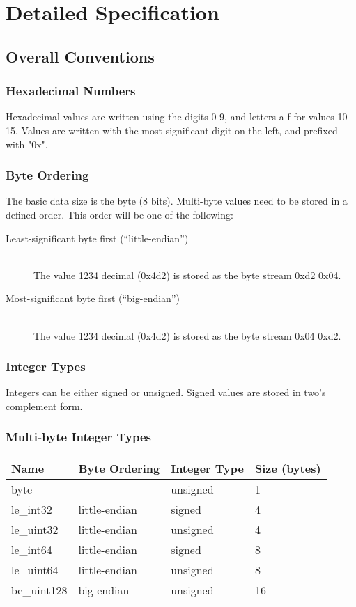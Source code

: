 \documentclass[10pt]{article}
\begin{document}
\section{Detailed Specification}
\subsection{Overall Conventions}
\subsubsection{Hexadecimal Numbers}
Hexadecimal values are written using the digits 0-9, and letters a-f for values 10-15.
Values are written with the most-significant digit on the left, and prefixed with "0x".

\subsubsection{Byte Ordering}
The basic data size is the byte (8 bits).
Multi-byte values need to be stored in a defined order.
This order will be one of the following:
\begin{description}
\item[Least-significant byte first (``little-endian'')]~\\
The value 1234 decimal (0x4d2) is stored as the byte stream 0xd2 0x04.

\item[Most-significant byte first (``big-endian'')]~\\
The value 1234 decimal (0x4d2) is stored as the byte stream 0x04 0xd2.
\end{description}

\subsubsection{Integer Types}
Integers can be either signed or unsigned.
Signed values are stored in two's complement form.

\subsubsection{Multi-byte Integer Types}
\begin{center}
\begin{tabular}{l l l l}
\hline
\textbf{Name} & \textbf{Byte Ordering} & \textbf{Integer Type} & \textbf{Size (bytes)} \\
\hline
byte & & unsigned & 1 \\
le\_int32 & little-endian & signed & 4 \\
le\_uint32 & little-endian & unsigned & 4 \\
le\_int64 & little-endian & signed & 8 \\
le\_uint64 & little-endian & unsigned & 8 \\
be\_uint128 & big-endian & unsigned & 16 \\
\end{tabular}
\end{center}
\end{document}
